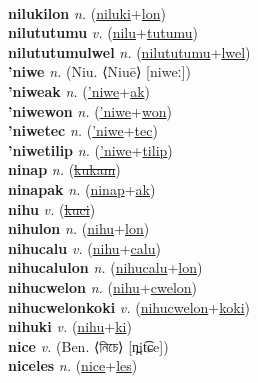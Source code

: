  \label{nilukiles} \\
\textbf{nilukilon} \textit{n.} (\hyperref[niluki]{niluki}+\hyperref[lon]{lon})
 \label{nilukilon} \\
\textbf{nilututumu} \textit{v.} (\hyperref[nilu]{nilu}+\hyperref[tutumu]{tutumu})
 \label{nilututumu} \\
\textbf{nilututumulwel} \textit{n.} (\hyperref[nilututumu]{nilututumu}+\hyperref[lwel]{lwel})
 \label{nilututumulwel} \\
\textbf{'niwe} \textit{n.} (Niu. ⟨Niuē⟩ [niweː])
 \label{'niwe} \\
\textbf{'niweak} \textit{n.} (\hyperref['niwe]{'niwe}+\hyperref[ak]{ak})
 \label{'niweak} \\
\textbf{'niwewon} \textit{n.} (\hyperref['niwe]{'niwe}+\hyperref[won]{won})
 \label{'niwewon} \\
\textbf{'niwetec} \textit{n.} (\hyperref['niwe]{'niwe}+\hyperref[tec]{tec})
 \label{'niwetec} \\
\textbf{'niwetilip} \textit{n.} (\hyperref['niwe]{'niwe}+\hyperref[tilip]{tilip})
 \label{'niwetilip} \\
\textbf{ninap} \textit{n.} (\hyperref[kukam]{\sout{kukam}})
 \label{ninap} \\
\textbf{ninapak} \textit{n.} (\hyperref[ninap]{ninap}+\hyperref[ak]{ak})
 \label{ninapak} \\
\textbf{nihu} \textit{v.} (\hyperref[kuci]{\sout{kuci}})
 \label{nihu} \\
\textbf{nihulon} \textit{n.} (\hyperref[nihu]{nihu}+\hyperref[lon]{lon})
 \label{nihulon} \\
\textbf{nihucalu} \textit{v.} (\hyperref[nihu]{nihu}+\hyperref[calu]{calu})
 \label{nihucalu} \\
\textbf{nihucalulon} \textit{n.} (\hyperref[nihucalu]{nihucalu}+\hyperref[lon]{lon})
 \label{nihucalulon} \\
\textbf{nihucwelon} \textit{n.} (\hyperref[nihu]{nihu}+\hyperref[cwelon]{cwelon})
 \label{nihucwelon} \\
\textbf{nihucwelonkoki} \textit{v.} (\hyperref[nihucwelon]{nihucwelon}+\hyperref[koki]{koki})
 \label{nihucwelonkoki} \\
\textbf{nihuki} \textit{v.} (\hyperref[nihu]{nihu}+\hyperref[ki]{ki})
 \label{nihuki} \\
\textbf{nice} \textit{v.} (Ben. ⟨নিচে⟩ [n̪it͡ɕe])
 \label{nice} \\
\textbf{niceles} \textit{n.} (\hyperref[nice]{nice}+\hyperref[les]{les})
 \label{niceles} \\

